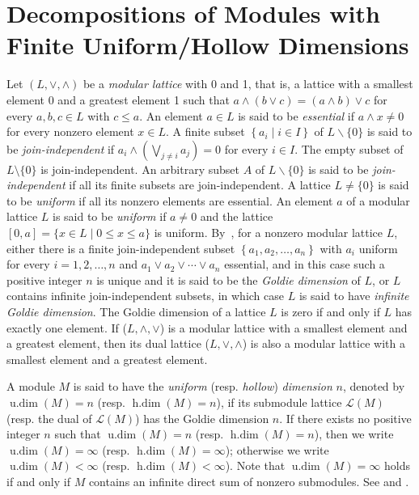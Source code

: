 \documentclass[11pt,a4paper]{amsart}
\theoremstyle{plain}
\theoremstyle{definition}
\theoremstyle{remark}
\newcommand{\udim}{\operatorname{u.dim}}
\newcommand{\hdim}{\operatorname{h.dim}}
\begin{document}
 \section{Decompositions of Modules with Finite Uniform/Hollow Dimensions}\label{Sec:Decompositions_of_Modules_with_Finite_Uniform_Hollow_Dimensions}


Let $(L, \vee, \wedge)$ be a \emph{modular lattice} with 0 and 1, that is, a lattice with a smallest element 0 and a greatest element 1 such that $a \wedge(b \vee c)=(a \wedge b) \vee c$ for every $a, b, c \in L$ with $c \leq a$. An element $a \in L$ is said to be \emph{essential} if $a \wedge x \neq 0$ for every nonzero element $x \in L$. A finite subset $\left\{a_i \mid i \in I\right\}$ of $L \backslash\{0\}$ is said to be \emph{join-independent} if $a_i \wedge\left(\bigvee_{j \neq i} a_j\right)=0$ for every $i \in I$. The empty subset of $ L\setminus  \{0\} $ is
join-independent. An arbitrary subset $A$ of $L \backslash\{0\}$ is said to be \emph{join-independent} if all its finite subsets are join-independent. A lattice $L \neq\{0\}$ is said to be \emph{uniform} if all its nonzero elements are essential. An element $a$ of a modular lattice $L$ is said to be \emph{uniform} if $a \neq 0$ and the lattice
$[0, a] =
\{x \in L \mid  0 \leq x \leq a\}$ is uniform. By~\cite[Theorem 2.36]{Facchini:ModuleTheory}, for a nonzero modular lattice $L$, either there is a finite join-independent subset $\left\{a_1, a_2, \ldots, a_n\right\}$ with $a_i$ uniform for every $i=1,2, \ldots, n$ and
$a_1 \vee a_2 \vee \cdots \vee a_n $ essential, and in this case such a positive integer $n$ is unique and it is said to be the \emph{Goldie dimension} of $L$, or $L$ contains infinite join-independent subsets, in which case $L$ is said to have \emph{infinite Goldie dimension}. The Goldie dimension of a lattice $L$ is zero if and only if $L$ has exactly one element.  If ($L, \wedge, \vee$) is a modular lattice with a smallest element and a greatest element, then its dual lattice ($L, \vee, \wedge$) is also a modular lattice with a smallest element and a greatest element.

A module $M$ is said to have the \emph{uniform} (resp. \emph{hollow}) \emph{dimension} $n$, denoted by $ \udim(M)=n $ (resp. $ \hdim(M)=n $), if its submodule lattice $\mathcal{L}(M)$ (resp. the dual of $\mathcal{L}(M)$) has the Goldie dimension $n$. If there exists no positive integer $ n $ such that $\udim(M)=n$ (resp. $\hdim(M)=n$), then we write $\udim(M)=\infty$ (resp. $\hdim(M)=\infty$); otherwise we write $\udim(M)<\infty$ (resp. $\hdim(M)<\infty$). Note that $\udim(M)=\infty$ holds if and only if $M$ contains an infinite direct sum of nonzero submodules. See \cite[Sections 2.6, 2.7, 2.8]{Facchini:ModuleTheory} and \cite[Section 6A]{Lam:LecturesOnModulesAndRings}.
\end{document}
